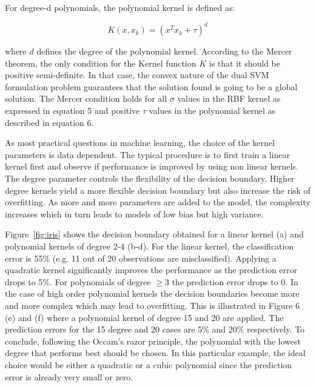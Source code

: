 \documentclass{article}
\begin{document}
For degree-d polynomials, the polynomial kernel is defined as:


\begin{equation}
K(x,x_k) = (x^Tx_k +\tau)^d
\end{equation}

where $d$ defines the degree of the polynomial kernel. According to the Mercer theorem, the only condition for the Kernel function $K$ is that it should be positive semi-definite. In that case, the convex nature of the dual SVM formulation problem guarantees that the solution found is going to be a global solution. The Mercer condition holds for all $\sigma$ values in the RBF kernel as expressed in equation 5 and positive $\tau$ values in the polynomial kernel as described in equation 6.



As most practical questions in machine learning, the choice of the kernel parameters is data dependent. The typical procedure is to first train a linear kernel first and observe if performance is improved by using non linear kernels. 
The degree parameter controls the flexibility of the decision boundary. Higher degree kernels yield a more flexible decision boundary but also increase the risk of overfitting. As more and more parameters are added to the model, the complexity increases which in turn leads to models of low bias but high variance.

Figure~\ref{fig:iris} shows the decision boundary obtained for a linear kernel (a) and polynomial kernels of degree 2-4 (b-d). For the linear kernel, the classification error is 55\% (e.g. 11 out of 20 observations are misclassified). Applying a quadratic kernel significantly improves the performance as the prediction error drops to 5\%. For polynomials of degree $\geq 3$ the prediction error drops to 0. In the case of high order polynomial kernels the decision boundaries become more and more complex which may lead to overfitting. This is illustrated in Figure 6 (e) and (f) where a polynomial kernel of degree 15 and 20 are applied. The prediction errors for the 15 degree and 20 cases are 5\% and 20\% respectively. To conclude, following the Occam’s razor principle, the polynomial with the lowest degree that performs best should be chosen. In this particular example, the ideal choice would be either a quadratic or a cubic polynomial since the prediction error is already very small or zero.
\end{document}
